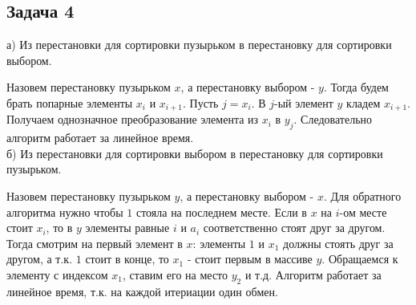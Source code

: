 \documentclass{article}
\begin{document}
	\subsection*{Задача 4}
	
	а) Из перестановки для сортировки пузырьком в перестановку для сортировки выбором. 
	
	Назовем перестановку пузырьком $x$, а перестановку выбором - $y$. Тогда будем брать попарные элементы $x_i$ и $x_{i+1}$. Пусть $j = x_i$. В $j$-ый элемент $y$ кладем $x_{i+1}$. Получаем однозначное преобразование элемента из $x_i$ в $y_j$. Следовательно алгоритм работает за линейное время. \\
	
	б) Из перестановки для сортировки выбором в перестановку для сортировки пузырьком. 
	
	Назовем перестановку пузырьком $y$, а перестановку выбором - $x$. Для обратного алгоритма нужно чтобы $1$ стояла на последнем месте. 
	Если в $x$ на $i$-ом месте стоит $x_i$, то в $y$ элементы равные $i$ и $a_i$ соответственно стоят друг за другом. Тогда смотрим на первый элемент в $x$: элементы $1$ и $x_1$ должны стоять друг за другом, а т.к. $1$ стоит в конце, то $x_1$ - стоит первым в массиве $y$. Обращаемся к элементу с индексом $x_1$, ставим его на место $y_2$ и т.д. Алгоритм работает за линейное время, т.к. на каждой итериации один обмен.
	
\end{document}
